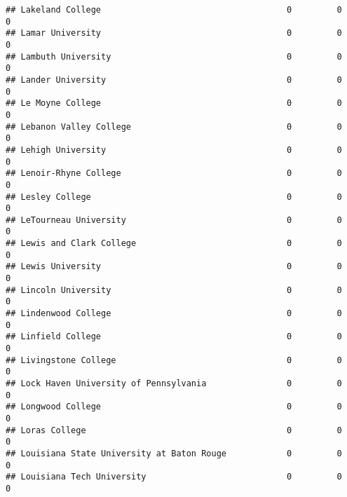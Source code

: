 \documentclass[
]{article}
\begin{document}
\begin{verbatim}
## Lakeland College                                     0         0           0
## Lamar University                                     0         0           0
## Lambuth University                                   0         0           0
## Lander University                                    0         0           0
## Le Moyne College                                     0         0           0
## Lebanon Valley College                               0         0           0
## Lehigh University                                    0         0           0
## Lenoir-Rhyne College                                 0         0           0
## Lesley College                                       0         0           0
## LeTourneau University                                0         0           0
## Lewis and Clark College                              0         0           0
## Lewis University                                     0         0           0
## Lincoln University                                   0         0           0
## Lindenwood College                                   0         0           0
## Linfield College                                     0         0           0
## Livingstone College                                  0         0           0
## Lock Haven University of Pennsylvania                0         0           0
## Longwood College                                     0         0           0
## Loras College                                        0         0           0
## Louisiana State University at Baton Rouge            0         0           0
## Louisiana Tech University                            0         0           0
## Loyola College                                       0         0           0
## Loyola Marymount University                          0         0           0
## Loyola University                                    0         0           0
## Loyola University Chicago                            0         0           0
## Luther College                                       0         0           0
## Lycoming College                                     0         0           0
## Lynchburg College                                    0         0           0
## Lyndon State College                                 0         0           0
## MacMurray College                                    0         0           0
## Malone College                                       0         0           0
## Manhattan College                                    0         0           0
## Manhattanville College                               0         0           0

\end{verbatim}
\end{document}
